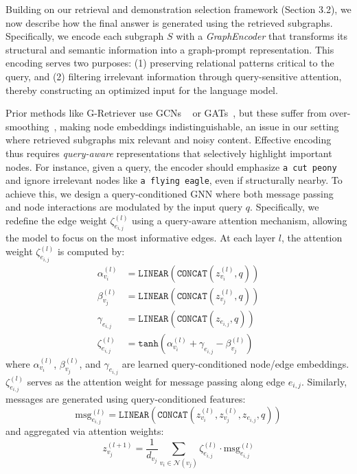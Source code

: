 Building on our retrieval and demonstration selection framework (Section 3.2), we now describe how the final answer is generated using the retrieved subgraphs. Specifically, we encode each subgraph $S$ with a \textit{GraphEncoder} that transforms its structural and semantic information into a graph-prompt representation. This encoding serves two purposes: (1) preserving relational patterns critical to the query, and (2) filtering irrelevant information through query-sensitive attention, thereby constructing an optimized input for the language model.

Prior methods like G-Retriever use GCNs ~\cite{gcn} or GATs~\cite{gat}, but these suffer from over-smoothing~\cite{oversmooth}, making node embeddings indistinguishable, an issue in our setting where retrieved subgraphs mix relevant and noisy content. Effective encoding thus requires \textit{query-aware} representations that selectively highlight important nodes. For instance, given a query, the encoder should emphasize \texttt{a cut peony} and ignore irrelevant nodes like \texttt{a flying eagle}, even if structurally nearby.
To achieve this, we design a query-conditioned GNN where both message passing and node interactions are modulated by the input query $q$. Specifically, we redefine the edge weight $\zeta_{e_{i,j}}^{(l)}$ using a query-aware attention mechanism, allowing the model to focus on the most informative edges.
At each layer $l$, the attention weight $\zeta_{e_{i,j}}^{(l)}$ is computed by:
\begin{align}
\alpha_{v_i}^{(l)} &= \texttt{LINEAR}\left(\texttt{CONCAT}(z_{v_i}^{(l)}, q)\right) \\
\beta_{v_j}^{(l)} &= \texttt{LINEAR}\left(\texttt{CONCAT}(z_{v_j}^{(l)}, q)\right) \\
\gamma_{e_{i,j}} &= \texttt{LINEAR}\left(\texttt{CONCAT}(z_{e_{i,j}}, q)\right) \\
\zeta_{e_{i,j}}^{(l)} &= \texttt{tanh}\left(\alpha_{v_i}^{(l)} + \gamma_{e_{i,j}} - \beta_{v_j}^{(l)}\right)
\end{align}
where $\alpha_{v_i}^{(l)}$, $\beta_{v_j}^{(l)}$, and $\gamma_{e_{i,j}}$ are learned {query-conditioned} node/edge embeddings. $\zeta_{e_{i,j}}^{(l)}$ serves as the attention weight for message passing 
along edge $e_{i,j}$. Similarly, messages are generated using query-conditioned features:
\begin{equation}
\text{msg}_{e_{i,j}}^{(l)} = \texttt{LINEAR}\left(\texttt{CONCAT}(z_{v_i}^{(l)}, z_{v_j}^{(l)}, z_{e_{i,j}}, q)\right)
\end{equation}
and aggregated via attention weights:
\begin{equation}
z_{v_j}^{(l+1)} = \frac{1}{d_{v_j}}\sum_{v_i \in \mathcal{N}(v_j)} \zeta_{e_{i,j}}^{(l)} \cdot \text{msg}_{e_{i,j}}^{(l)}
\end{equation}

